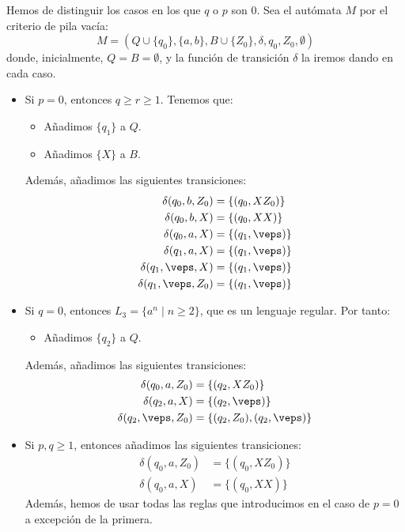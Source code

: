\begin{ejercicio}
\begin{enumerate}
        Hemos de distinguir los casos en los que $q$ o $p$ son $0$. Sea el autómata $M$ por el criterio de pila vacía:
        $$M = (Q\cup \{q_0\},\{a,b\},B\cup \{Z_0\},\delta,q_0,Z_0,\emptyset)$$
        donde, inicialmente, $Q=B=\emptyset$, y la función de transición $\delta$ la iremos dando en cada caso.
        \begin{itemize}
            \item Si $p=0$, entonces $q\geq r\geq 1$. Tenemos que:
            \begin{itemize}
                \item Añadimos $\{q_1\}$ a $Q$.
                \item Añadimos $\{X\}$ a $B$.
            \end{itemize}
            Además, añadimos las siguientes transiciones:
            \begin{align*}
                \delta(q_0,b,Z_0) &= \{(q_0,XZ_0)\} \\
                \delta(q_0,b,X) &= \{(q_0,XX)\} \\
                \delta(q_0,a,X) &= \{(q_1,\veps)\} \\
                \delta(q_1,a,X) &= \{(q_1,\veps)\} \\
                \delta(q_1,\veps,X) &= \{(q_1,\veps)\}\\
                \delta(q_1,\veps,Z_0) &= \{(q_1,\veps)\}
            \end{align*}

            \item Si $q=0$, entonces $L_3=\{a^n\mid n\geq 2\}$, que es un lenguaje regular. Por tanto:
            \begin{itemize}
                \item Añadimos $\{q_2\}$ a $Q$.
            \end{itemize}
            Además, añadimos las siguientes transiciones:
            \begin{align*}
                \delta(q_0,a,Z_0) &= \{(q_2,XZ_0)\} \\
                \delta(q_2,a,X) &= \{(q_2,\veps)\} \\
                \delta(q_2,\veps,Z_0) &= \{(q_2,Z_0),(q_2,\veps)\}
            \end{align*}

            \item Si $p,q\geq 1$, entonces añadimos las siguientes transiciones:
            \begin{align*}
                \delta(q_0,a,Z_0) &= \{(q_0,XZ_0)\} \\
                \delta(q_0,a,X) &= \{(q_0,XX)\}
            \end{align*}
            Además, hemos de usar todas las reglas que introducimos en el caso de $p=0$ a excepción de la primera.
        \end{itemize}
    \end{enumerate}
\end{ejercicio}

